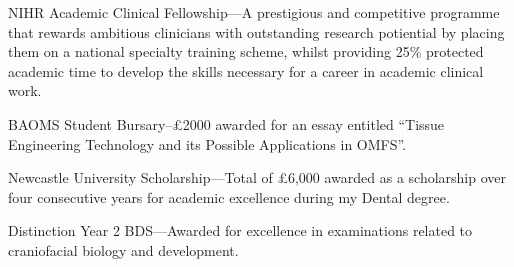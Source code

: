  NIHR Academic Clinical Fellowship---A prestigious and competitive programme that rewards ambitious clinicians with outstanding research potiential by placing them on a national specialty training scheme, whilst providing 25\% protected academic time to develop the skills necessary for a career in academic clinical work.

 BAOMS Student Bursary--£2000 awarded for an essay entitled “Tissue Engineering Technology and its Possible Applications in OMFS”.

 Newcastle University Scholarship---Total of \pounds6,000 awarded as a scholarship over four consecutive years for academic excellence during my Dental degree.

 Distinction Year 2 BDS---Awarded for excellence in examinations related to craniofacial biology and development.
